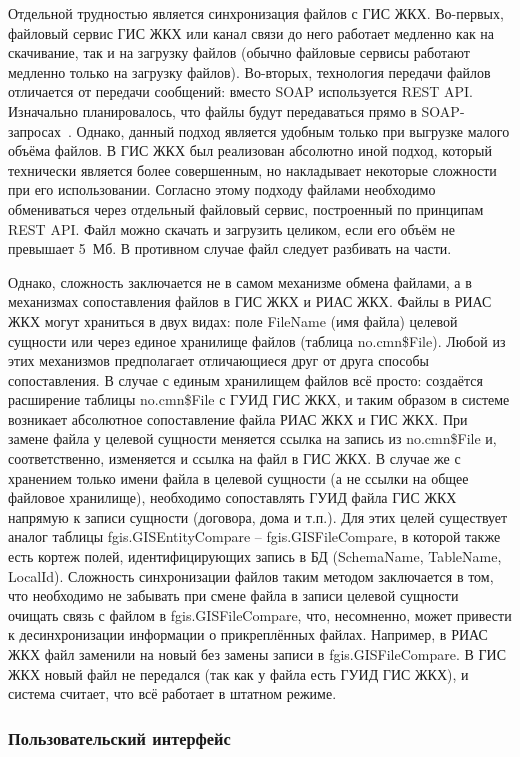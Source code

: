 Отдельной трудностью является синхронизация файлов с ГИС ЖКХ.
Во-первых, файловый сервис ГИС ЖКХ или канал связи до него работает медленно как на скачивание, так и на загрузку файлов (обычно файловые сервисы работают медленно только на загрузку файлов).
Во-вторых, технология передачи файлов отличается от передачи сообщений: вместо SOAP используется REST API.
Изначально планировалось, что файлы будут передаваться прямо в SOAP-запросах~\cite{gis_doc_tff}.
Однако, данный подход является удобным только при выгрузке малого объёма файлов.
В ГИС ЖКХ был реализован абсолютно иной подход, который технически является более совершенным, но накладывает некоторые сложности при его использовании.
Согласно этому подходу файлами необходимо обмениваться через отдельный файловый сервис, построенный по принципам REST API.
Файл можно скачать и загрузить целиком, если его объём не превышает 5~Мб.
В противном случае файл следует разбивать на части.

Однако, сложность заключается не в самом механизме обмена файлами, а в механизмах сопоставления файлов в ГИС ЖКХ и РИАС ЖКХ.
Файлы в РИАС ЖКХ могут храниться в двух видах: поле FileName (имя файла) целевой сущности или через единое хранилище файлов (таблица no.cmn\$File).
Любой из этих механизмов предполагает отличающиеся друг от друга способы сопоставления.
В случае с единым хранилищем файлов всё просто: создаётся расширение таблицы no.cmn\$File с ГУИД ГИС ЖКХ, и таким образом в системе возникает абсолютное сопоставление файла РИАС ЖКХ и ГИС ЖКХ.
При замене файла у целевой сущности меняется ссылка на запись из no.cmn\$File и, соответственно, изменяется и ссылка на файл в ГИС ЖКХ.
В случае же с хранением только имени файла в целевой сущности (а не ссылки на общее файловое хранилище), необходимо сопоставлять ГУИД файла ГИС ЖКХ напрямую к записи сущности (договора, дома и т.п.).
Для этих целей существует аналог таблицы fgis.GISEntityCompare -- fgis.GISFileCompare, в которой также есть кортеж полей, идентифицирующих запись в БД (SchemaName, TableName, LocalId).
Сложность синхронизации файлов таким методом заключается в том, что необходимо не забывать при смене файла в записи целевой сущности очищать связь с файлом в fgis.GISFileCompare, что, несомненно, может привести к десинхронизации информации о прикреплённых файлах.
Например, в РИАС ЖКХ файл заменили на новый без замены записи в fgis.GISFileCompare.
В ГИС ЖКХ новый файл не передался (так как у файла есть ГУИД ГИС ЖКХ), и система считает, что всё работает в штатном режиме.

\subsubsection{Пользовательский интерфейс}

